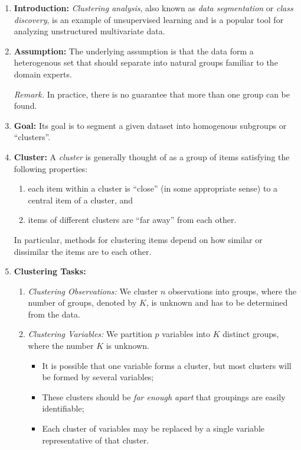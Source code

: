 \documentclass[12pt]{article}
\begin{document}
\begin{enumerate}[label=\textbf{\arabic*.}]

	\item \textbf{Introduction:} \textit{Clustering analysis}, also known as \textit{data segmentation} or \emph{class discovery}, is an example of unsupervised learning and is a popular tool for analyzing unstructured multivariate data. 
	
	\item \textbf{Assumption:} The underlying assumption is that the data form a heterogenous set that should separate into natural groups familiar to the domain experts. 
	
	\textit{Remark.} In practice, there is no guarantee that more than one group can be found. 
	
	\item \textbf{Goal:} Its goal is to segment a given dataset into homogenous subgroups or ``clusters''. 
	
	\item \textbf{Cluster:} A \emph{cluster} is generally thought of as a group of items satisfying the following properties: 
	\begin{enumerate}
		\item each item within a cluster is ``close'' (in some appropriate sense) to a central item of a cluster, and 
		\item items of different clusters are ``far away'' from each other. 
	\end{enumerate}
	In particular, methods for clustering items depend on how similar or dissimilar the items are to each other. 
	
	\item \textbf{Clustering Tasks:} 
	\begin{enumerate}
		\item \textit{Clustering Observations:} We cluster $n$ observations into groups, where the number of groups, denoted by $K$, is unknown and has to be determined from the data. 
	
		\item \textit{Clustering Variables:} We partition $p$ variables into $K$ distinct groups, where the number $K$ is unknown. 
		\begin{itemize}
			\item It is possible that one variable forms a cluster, but most clusters will be formed by several variables; 
			\item These clusters should be \textit{far enough apart} that groupings are easily identifiable; 
			\item Each cluster of variables may be replaced by a single variable representative of that cluster. 
		\end{itemize}
		

\end{enumerate}
\end{enumerate}
\end{document}
